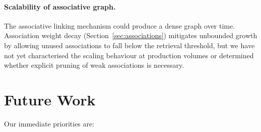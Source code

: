 \documentclass[11pt,a4paper]{article}
\begin{document}
\paragraph{Scalability of associative graph.} The associative linking mechanism could produce a dense graph over time. Association weight decay (Section~\ref{sec:associations}) mitigates unbounded growth by allowing unused associations to fall below the retrieval threshold, but we have not yet characterised the scaling behaviour at production volumes or determined whether explicit pruning of weak associations is necessary.

\section{Future Work}
\label{sec:future}

Our immediate priorities are:
\end{document}
